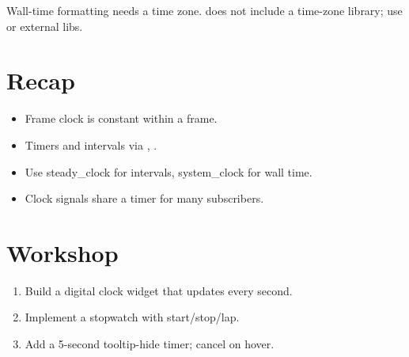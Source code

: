Wall-time formatting needs a time zone. \maya{} does not
include a time-zone library; use  or external libs.

\section{Recap}

\begin{recap}
\begin{itemize}[leftmargin=*]
  \item Frame clock is constant within a frame.
  \item Timers and intervals via ,
    .
  \item Use steady\_clock for intervals, system\_clock for
    wall time.
  \item Clock signals share a timer for many subscribers.
\end{itemize}
\end{recap}

\section*{Workshop}

\begin{enumerate}[leftmargin=*]
  \item Build a digital clock widget that updates every
    second.
  \item Implement a stopwatch with start/stop/lap.
  \item Add a 5-second tooltip-hide timer; cancel on hover.
\end{enumerate}
